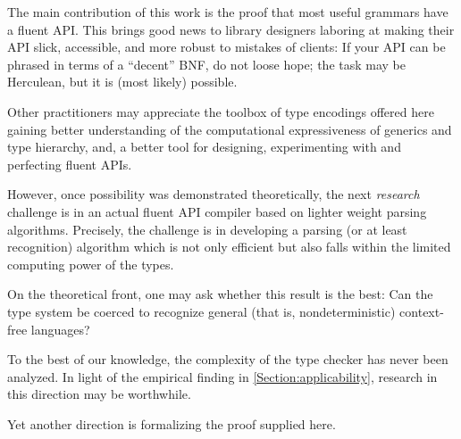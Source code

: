 The main contribution of this work is the proof that 
  most useful grammars have a fluent API.
This brings good news to library designers laboring
  at making their API slick, accessible, and more
  robust to mistakes of clients: 
If your API can be phrased in terms of a ``decent''
  BNF, do not loose hope; the task may be Herculean, but it is (most likely) possible. 

Other practitioners may appreciate the toolbox of type encodings offered here 
  gaining better understanding of the computational expressiveness of
  \Java generics and type hierarchy, and, a better tool
  for designing, experimenting with and perfecting fluent APIs.

However, once possibility was demonstrated theoretically, the next \emph{research} 
    challenge is in an actual fluent API compiler based on lighter weight
  parsing algorithms.
Precisely, the challenge 
  is in developing a parsing (or at least recognition) 
  algorithm which is not only efficient but also falls within the limited computing power of the \Java types. 

On the theoretical front, one may ask whether 
  this result is the best:
Can the \Java type system be coerced to recognize
  general (that is, nondeterministic) context-free languages?

To the best of our knowledge, 
  the complexity of the \Java type checker has never been analyzed. 
In light of the empirical finding in \cref{Section:applicability},
  research in this direction may be worthwhile. 

Yet another direction is formalizing the proof supplied here. 




